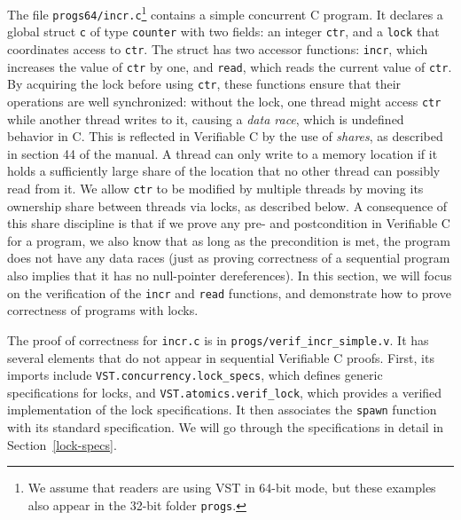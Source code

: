 \documentclass[11pt]{article}
\begin{document}
The file \texttt{progs64/incr.c}\footnote{We assume that readers are using VST in 64-bit mode, but these examples also appear in the 32-bit folder \texttt{progs}.} contains a simple concurrent C program. It declares a global struct \texttt{c} of type \texttt{counter} with two fields: an integer \texttt{ctr}, and a \texttt{lock} that coordinates access to \texttt{ctr}. The struct has two accessor functions: \texttt{incr}, which increases the value of \texttt{ctr} by one, and \texttt{read}, which reads the current value of \texttt{ctr}. By acquiring the lock before using \texttt{ctr}, these functions ensure that their operations are well synchronized: without the lock, one thread might access \texttt{ctr} while another thread writes to it, causing a \emph{data race}, which is undefined behavior in C. This is reflected in Verifiable C by the use of \emph{shares}, as described in section 44 of the manual. A thread can only write to a memory location if it holds a sufficiently large share of the location that no other thread can possibly read from it. We allow \texttt{ctr} to be modified by multiple threads by moving its ownership share between threads via locks, as described below. A consequence of this share discipline is that if we prove any pre- and postcondition in Verifiable C for a program, we also know that as long as the precondition is met, the program does not have any data races (just as proving correctness of a sequential program also implies that it has no null-pointer dereferences). In this section, we will focus on the verification of the \texttt{incr} and \texttt{read} functions, and demonstrate how to prove correctness of programs with locks.

The proof of correctness for \texttt{incr.c} is in \texttt{progs/verif\_incr\_simple.v}. It has several elements that do not appear in sequential Verifiable C proofs. First, its imports include \texttt{VST.concurrency.lock\_specs}, which defines generic specifications for locks, and \texttt{VST.atomics.verif\_lock}, which provides a verified implementation of the lock specifications. It then associates the \texttt{spawn} function with its standard specification. We will go through the specifications in detail in Section~\ref{lock-specs}.
\end{document}
